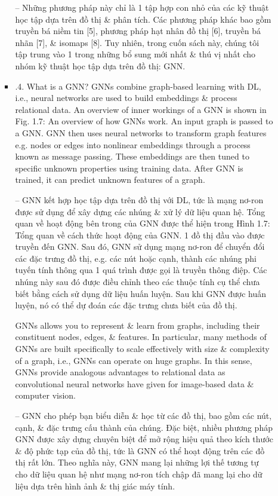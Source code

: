 \documentclass{article}
\begin{document}
\begin{itemize}
\begin{itemize}
\begin{itemize}
            -- Những phương pháp này chỉ là 1 tập hợp con nhỏ của các kỹ thuật học tập dựa trên đồ thị \& phân tích. Các phương pháp khác bao gồm truyền bá niềm tin [5], phương pháp hạt nhân đồ thị [6], truyền bá nhãn [7], \& isomaps [8]. Tuy nhiên, trong cuốn sách này, chúng tôi tập trung vào 1 trong những bổ sung mới nhất \& thú vị nhất cho nhóm kỹ thuật học tập dựa trên đồ thị: GNN.
            \item {.4. What is a GNN?} GNNs combine graph-based learning with DL, i.e., neural networks are used to build embeddings \& process relational data. An overview of inner workings of a GNN is shown in {\sf Fig. 1.7: An overview of how GNNs work. An input graph is passed to a GNN. GNN then uses neural networks to transform graph features e.g. nodes or edges into nonlinear embeddings through a process known as message passing. These embeddings are then tuned to specific unknown properties using training data. After GNN is trained, it can predict unknown features of a graph.}

            -- GNN kết hợp học tập dựa trên đồ thị với DL, tức là mạng nơ-ron được sử dụng để xây dựng các nhúng \& xử lý dữ liệu quan hệ. Tổng quan về hoạt động bên trong của GNN được thể hiện trong {\sf Hình 1.7: Tổng quan về cách thức hoạt động của GNN. 1 đồ thị đầu vào được truyền đến GNN. Sau đó, GNN sử dụng mạng nơ-ron để chuyển đổi các đặc trưng đồ thị, e.g. các nút hoặc cạnh, thành các nhúng phi tuyến tính thông qua 1 quá trình được gọi là truyền thông điệp. Các nhúng này sau đó được điều chỉnh theo các thuộc tính cụ thể chưa biết bằng cách sử dụng dữ liệu huấn luyện. Sau khi GNN được huấn luyện, nó có thể dự đoán các đặc trưng chưa biết của đồ thị.}

            GNNs allows you to represent \& learn from graphs, including their constituent nodes, edges, \& features. In particular, many methods of GNNs are built specifically to scale effectively with size \& complexity of a graph, i.e., GNNs can operate on huge graphs. In this sense, GNNs provide analogous advantages to relational data as convolutional neural networks have given for image-based data \& computer vision.

            -- GNN cho phép bạn biểu diễn \& học từ các đồ thị, bao gồm các nút, cạnh, \& đặc trưng cấu thành của chúng. Đặc biệt, nhiều phương pháp GNN được xây dựng chuyên biệt để mở rộng hiệu quả theo kích thước \& độ phức tạp của đồ thị, tức là GNN có thể hoạt động trên các đồ thị rất lớn. Theo nghĩa này, GNN mang lại những lợi thế tương tự cho dữ liệu quan hệ như mạng nơ-ron tích chập đã mang lại cho dữ liệu dựa trên hình ảnh \& thị giác máy tính.


\end{itemize}
\end{itemize}
\end{itemize}
\end{document}
